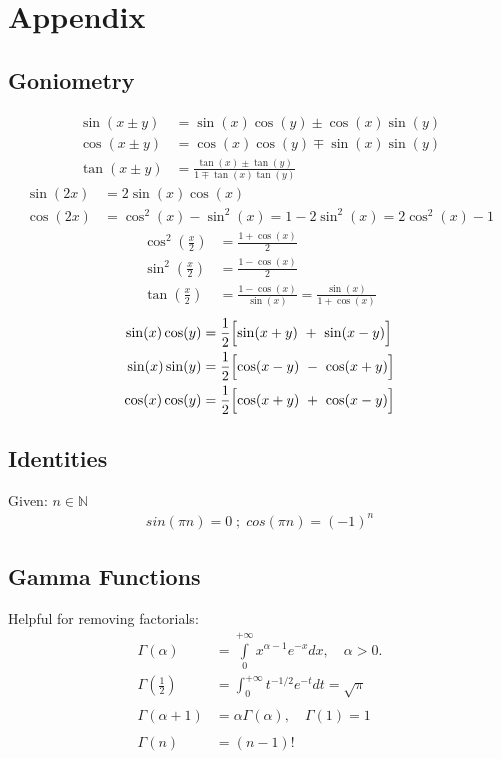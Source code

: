 \section{Appendix}
\subsection{Goniometry}
\begin{align*}
    \sin(x\pm y)&=\sin(x)\cos(y)\pm\cos(x)\sin(y)\\
    \cos(x\pm y)&=\cos(x)\cos(y)\mp\sin(x)\sin(y)\\
    \tan(x\pm y)&=\frac{\tan(x)\pm\tan(y)}{1\mp\tan(x)\tan(y)}
\end{align*}
\begin{align*}
    \sin(2x)&=2\sin(x)\cos(x)\\
    \cos(2x)&=\cos^2(x)-\sin^2(x)=1-2\sin^2(x)=2\cos^2(x)-1
\end{align*}
\begin{align*}
    \cos^2\left(\frac x2\right)&=\frac{1+\cos(x)}{2}\\
    \sin^2\left(\frac x2\right)&=\frac{1-\cos(x)}{2}\\
    \tan\left(\frac x2\right)&=\frac{1-\cos(x)}{\sin(x)}=\frac{\sin(x)}{1+\cos(x)}
\end{align*}
\begin{align*}
    \sin(x)\cos(y)&=\frac12\Bigl[\sin(x+y)~+~\sin(x-y)\Bigr]\\
    \sin(x)\sin(y)&=\frac12\Bigl[\cos(x-y)~-~\cos(x+y)\Bigr]\\
    \cos(x)\cos(y)&=\frac12\Bigl[\cos(x+y)~+~\cos(x-y)\Bigr]
\end{align*}
\subsection{Identities}
Given: $n \in \mathbb{N}$
\begin{align*}
    sin(\pi n) = 0 \; ;  \; cos(\pi n)=(-1)^n
\end{align*}

\subsection{Gamma Functions}
Helpful for removing factorials:
\begin{align*}
    \Gamma(\alpha)&=\int\limits_{0}^{+\infty}x^{\alpha-1}e^{-x}dx,\quad\alpha>0. \\
    \Gamma\left(\frac12\right)&=\int_0^{+\infty}t^{-1/2}e^{-t}dt=\sqrt{\pi} \\ \\
    \Gamma(\alpha+1)&=\alpha\Gamma(\alpha),\quad \Gamma(1)=1 \\ \\
    \Gamma(n)&=(n-1)!
\end{align*}